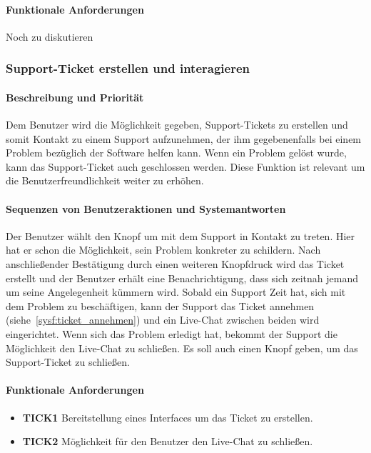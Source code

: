 \paragraph{Funktionale Anforderungen}
Noch zu diskutieren



\subsubsection{Support-Ticket erstellen und interagieren}
\label{sysf:ticket_erstellen}
\paragraph{Beschreibung und Priorität}
Dem Benutzer wird die Möglichkeit gegeben, Support-Tickets zu erstellen und somit Kontakt zu einem Support aufzunehmen,
der ihm gegebenenfalls bei einem Problem bezüglich der Software helfen kann.
Wenn ein Problem gelöst wurde, kann das Support-Ticket auch geschlossen werden.
Diese Funktion ist relevant um die Benutzerfreundlichkeit weiter zu erhöhen.
\paragraph{Sequenzen von Benutzeraktionen und Systemantworten}
Der Benutzer wählt den Knopf  um mit dem Support in Kontakt zu treten.
Hier hat er schon die Möglichkeit, sein Problem konkreter zu schildern.
Nach anschließender Bestätigung durch einen weiteren Knopfdruck wird das Ticket erstellt
und der Benutzer erhält eine Benachrichtigung, dass sich zeitnah jemand um seine Angelegenheit kümmern wird.
Sobald ein Support Zeit hat, sich mit dem Problem zu beschäftigen, kann der Support das Ticket annehmen (siehe~\ref{sysf:ticket_annehmen})
und ein Live-Chat zwischen beiden wird eingerichtet.
Wenn sich das Problem erledigt hat, bekommt der Support die Möglichkeit den Live-Chat zu schließen.
Es soll auch einen Knopf geben, um das Support-Ticket zu schließen.
\paragraph{Funktionale Anforderungen}
\begin{itemize}
	\item \textbf{TICK1} Bereitstellung eines Interfaces um das Ticket zu erstellen.
	\item \textbf{TICK2} Möglichkeit für den Benutzer den Live-Chat zu schließen.
\end{itemize}

